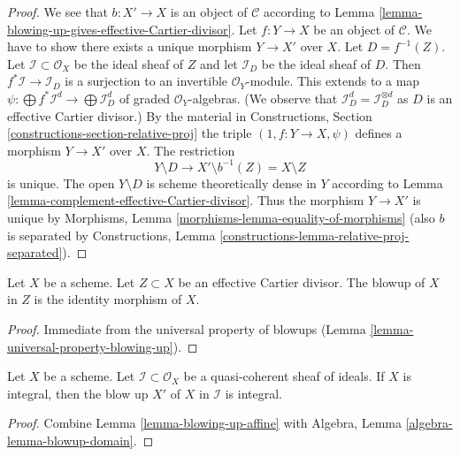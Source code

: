 \begin{proof}
We see that $b : X' \to X$ is an object of $\mathcal{C}$ according to
Lemma \ref{lemma-blowing-up-gives-effective-Cartier-divisor}.
Let $f : Y \to X$ be an object of $\mathcal{C}$. We have to show there exists
a unique morphism $Y \to X'$ over $X$. Let $D = f^{-1}(Z)$.
Let $\mathcal{I} \subset \mathcal{O}_X$ be the ideal sheaf of $Z$
and let $\mathcal{I}_D$ be the ideal sheaf of $D$. Then
$f^*\mathcal{I} \to \mathcal{I}_D$ is a surjection
to an invertible $\mathcal{O}_Y$-module. This extends to a map
$\psi : \bigoplus f^*\mathcal{I}^d \to \bigoplus \mathcal{I}_D^d$
of graded $\mathcal{O}_Y$-algebras. (We observe that
$\mathcal{I}_D^d = \mathcal{I}_D^{\otimes d}$ as $D$ is an
effective Cartier divisor.) By the material in
Constructions, Section \ref{constructions-section-relative-proj}
the triple $(1, f : Y \to X, \psi)$ defines a morphism $Y \to X'$ over $X$.
The restriction
$$
Y \setminus D \longrightarrow X' \setminus b^{-1}(Z) = X \setminus Z
$$
is unique. The open $Y \setminus D$ is scheme theoretically dense in $Y$
according to Lemma \ref{lemma-complement-effective-Cartier-divisor}. 
Thus the morphism $Y \to X'$ is unique by
Morphisms, Lemma \ref{morphisms-lemma-equality-of-morphisms}
(also $b$ is separated by Constructions, Lemma
\ref{constructions-lemma-relative-proj-separated}).
\end{proof}

\begin{lemma}
\label{lemma-blow-up-effective-Cartier-divisor}
Let $X$ be a scheme. Let $Z \subset X$ be an effective Cartier divisor.
The blowup of $X$ in $Z$ is the identity morphism of $X$.
\end{lemma}

\begin{proof}
Immediate from the universal property of blowups
(Lemma \ref{lemma-universal-property-blowing-up}).
\end{proof}

\begin{lemma}
\label{lemma-blow-up-integral-scheme}
Let $X$ be a scheme. Let $\mathcal{I} \subset \mathcal{O}_X$ be a
quasi-coherent sheaf of ideals. If $X$ is integral, then the
blow up $X'$ of $X$ in $\mathcal{I}$ is integral.
\end{lemma}

\begin{proof}
Combine Lemma \ref{lemma-blowing-up-affine}
with Algebra, Lemma \ref{algebra-lemma-blowup-domain}.
\end{proof}

